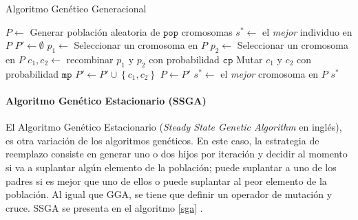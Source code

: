 \begin{algorithm}
\caption{Algoritmo Genético Generacional}
\label{gga}
\begin{algorithmic}[1]


\State $P \gets$ Generar población aleatoria de $\texttt{pop}$ cromosomas
\State $s^* \gets $ el \emph{mejor} individuo en $P$
	\State $P' \gets \emptyset$
		\State $p_1 \gets$ Seleccionar un cromosoma en $P$
		\State $p_2 \gets$ Seleccionar un cromosoma en $P$
		\State $c_1, c_2 \gets $ recombinar $p_1$ y $p_2$ con probabilidad $\texttt{cp}$
		\State Mutar $c_1$ y $c_2$ con probabilidad $\texttt{mp}$
		\State $P' \gets P' \cup \left\lbrace c_1, c_2 \right\rbrace$
	\EndWhile
	\State $P \gets P'$
		\State $s^* \gets$ el \emph{mejor} cromosoma en $P$
	\EndIf
\EndWhile
\State \Return $s^*$

\end{algorithmic}
\end{algorithm}

\paragraph{Algoritmo Genético Estacionario (SSGA)}

El Algoritmo Genético Estacionario (\emph{Steady State Genetic Algorithm} en inglés), es otra variación de los algoritmos genéticos. En este caso, la estrategia de reemplazo consiste en generar uno o dos hijos por iteración y decidir al momento si va a suplantar algún elemento de la población; puede suplantar a uno de los padres si es mejor que uno de ellos o puede suplantar al peor elemento de la población. Al igual que GGA, se tiene que definir un operador de mutación y cruce. SSGA se presenta en el algoritmo \ref{sga} \cite{flores2014metaheuristics}.

